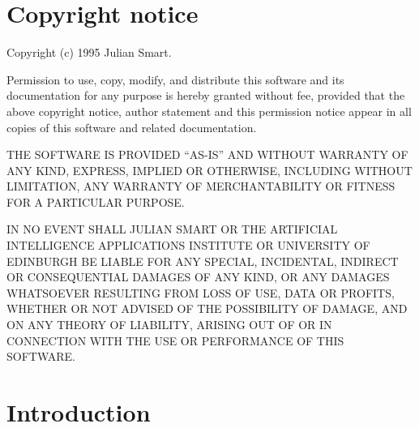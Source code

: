 %
%
\parskip=10pt%
\parindent=0pt%
%
%
\makeindex%
%
\maketitle%
\pagestyle{fancyplain}%
%
%
%
\setfooter{\thepage}{}{}{}{}{\thepage}%
\tableofcontents%

\chapter*{Copyright notice}%
%
\setfooter{\thepage}{}{}{}{}{\thepage}%

Copyright (c) 1995 Julian Smart.

Permission to use, copy, modify, and distribute this software and its
documentation for any purpose is hereby granted without fee, provided that the
above copyright notice, author statement and this permission notice appear in
all copies of this software and related documentation.

THE SOFTWARE IS PROVIDED ``AS-IS'' AND WITHOUT WARRANTY OF ANY KIND, EXPRESS,
IMPLIED OR OTHERWISE, INCLUDING WITHOUT LIMITATION, ANY WARRANTY OF
MERCHANTABILITY OR FITNESS FOR A PARTICULAR PURPOSE.

IN NO EVENT SHALL JULIAN SMART OR THE ARTIFICIAL INTELLIGENCE
APPLICATIONS INSTITUTE OR UNIVERSITY OF EDINBURGH BE LIABLE FOR ANY
SPECIAL, INCIDENTAL, INDIRECT OR CONSEQUENTIAL DAMAGES OF ANY KIND, OR
ANY DAMAGES WHATSOEVER RESULTING FROM LOSS OF USE, DATA OR PROFITS,
WHETHER OR NOT ADVISED OF THE POSSIBILITY OF DAMAGE, AND ON ANY THEORY
OF LIABILITY, ARISING OUT OF OR IN CONNECTION WITH THE USE OR
PERFORMANCE OF THIS SOFTWARE.

\chapter{Introduction}%
%
%
\setfooter{\thepage}{}{}{}{}{\thepage}%

